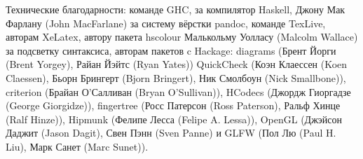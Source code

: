 Технические благодарности: команде GHC, за компилятор Haskell, Джону Мак
Фарлану (John MacFarlane) за систему вёрстки pandoc, команде TexLive,
авторам XeLatex, автору пакета hscolour Малькольму Уолласу (Malcolm
Wallace) за подсветку синтаксиса, авторам пакетов c Hackage: diagrams
(Брент Йорги (Brent Yorgey), Райан Йэйтс (Ryan Yates)) QuickCheck (Коэн
Клаессен (Koen Claessen), Бьорн Брингерт (Bjorn Bringert), Ник Смолбоун
(Nick Smallbone)), criterion (Брайан О'Салливан (Bryan O'Sullivan)),
HCodecs (Джордж Гиоргадзе (George Giorgidze)), fingertree (Росс Патерсон
(Ross Paterson), Ральф Хинце (Ralf Hinze)), Hipmunk (Фелипе Лесса
(Felipe A. Lessa)), OpenGL (Джэйсон Даджит (Jason Dagit), Свен Пэнн
(Sven Panne) и GLFW (Пол Лю (Paul H. Liu), Марк Санет (Marc Sunet)).
